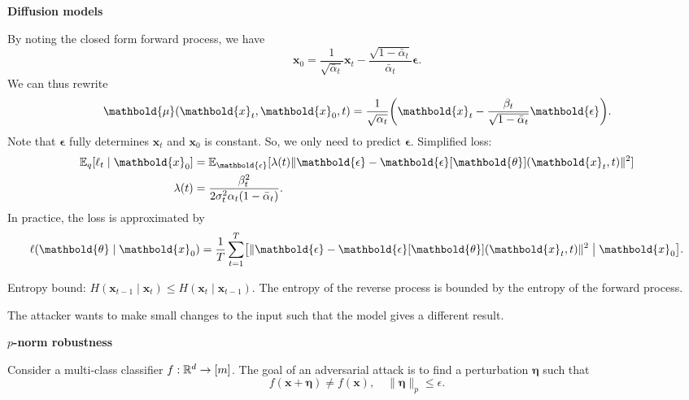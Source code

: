 \documentclass[10pt]{article}
\newenvironment{topic}[1]
{\textbf{\sffamily \footnotesize \colorbox{black}{\rlap{\textbf{\textcolor{white}{#1}}}\hspace{\linewidth}\hspace{-2\fboxsep}}}}
{}
\newenvironment{subtopic}[1]
{\vspace{0.1cm} \begin{center}\textbf{\footnotesize \sffamily #1}\end{center}}
{}
\renewcommand{\vec}[1]{\ensuremath{\mathbold{#1}}}
\begin{document}
\begin{multicols*}{3}
\begin{topic}{Generative models}
\begin{subtopic}{Diffusion models}
            By noting the closed form forward process, we have \[
                \vec{x}_0 = \frac{1}{\sqrt{\bar{\alpha}_t}} \vec{x}_t - \frac{\sqrt{1-\bar{\alpha}_t}}{\bar{\alpha}_t} \vec{\epsilon}.
            \]
            We can thus rewrite \[
                \vec{\mu}(\vec{x}_t, \vec{x}_0, t) = \frac{1}{\sqrt{\alpha_t}} \lft( \vec{x}_t - \frac{\beta_t}{\sqrt{1-\bar{\alpha}_t}} \vec{\epsilon} \rgt).
            \]
            Note that $\vec{\epsilon}$ fully determines $\vec{x}_t$ and $\vec{x}_0$ is constant. So, we only
            need to predict $\vec{\epsilon}$. Simplified loss:
            \begin{align*}
                \E_q[\ell_t \mid \vec{x}_0] & = \E_{\vec{\epsilon}}[\lambda(t) \| \vec{\epsilon} - \vec{\epsilon}[\vec{\theta}](\vec{x}_t, t) \|^2] \\
                \lambda(t)                  & = \frac{\beta_t^2}{2 \sigma_t^2 \alpha_t (1-\bar{\alpha}_t)}.
            \end{align*}
            In practice, the loss is approximated by \[
                \ell(\vec{\theta} \mid \vec{x}_0) = \frac{1}{T} \sum_{t=1}^{T} \lft[ \| \vec{\epsilon} - \vec{\epsilon}[\vec{\theta}](\vec{x}_t, t) \|^2 \;\middle|\; \vec{x}_0 \rgt].
            \]

            Entropy bound: $H(\vec{x}_{t-1} \mid \vec{x}_t) \leq H(\vec{x}_t \mid \vec{x}_{t-1})$.
            The entropy of the reverse process is bounded by the entropy of the forward process.
        \end{subtopic}

    \end{topic}

    \begin{topic}{Adversarial attacks}

        The attacker wants to make small changes to the input such that the model gives a different result.

        \begin{subtopic}{$p$-norm robustness}
            Consider a multi-class classifier $f: \mathbb{R}^d \to [m]$. The goal of an adversarial attack is to find a perturbation $\vec{\eta}$ such that \[
                f(\vec{x} + \vec{\eta}) \neq f(\vec{x}), \quad \| \vec{\eta} \|_p \leq \epsilon.
            \]


\end{subtopic}
\end{topic}
\end{multicols*}
\end{document}
